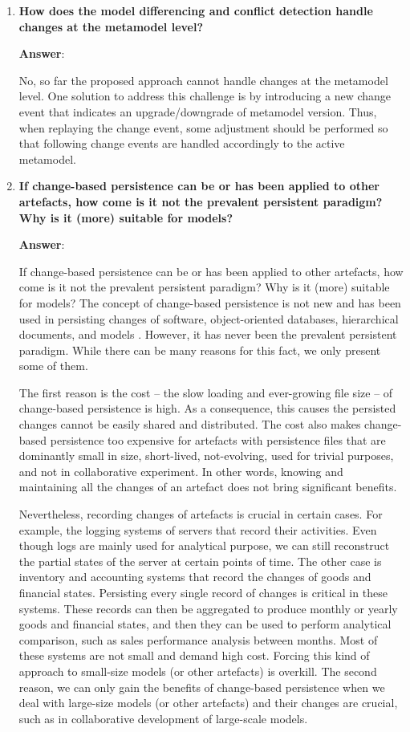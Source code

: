 \begin{enumerate}
  \item \textbf{How does the model differencing and conflict detection handle changes at the metamodel level?}
  
  \textbf{Answer}:
  
  No, so far the proposed approach cannot handle changes at the metamodel level. One solution to address this challenge is by introducing a new change event that indicates an upgrade/downgrade of metamodel version. Thus, when replaying the change event, some adjustment should be performed so that following change events are handled accordingly to the active metamodel.
  
  \item \textbf{If change-based persistence can be or has been applied to other artefacts, how come is it not the prevalent persistent paradigm? Why is it (more) suitable for models?}
  
  \textbf{Answer}:
  
  If change-based persistence can be or has been applied to other artefacts, how come is it not the prevalent persistent paradigm? Why is it (more) suitable for models? The concept of change-based persistence is not new and has been used in persisting changes of software, object-oriented databases, hierarchical documents, and models 
  \cite{DBLP:journals/entcs/RobbesL07,DBLP:conf/sde/LippeO92,DBLP:conf/caise/IgnatN05,koegel2010emfstore}. However, it has never been the prevalent persistent paradigm. While there can be many reasons for this fact, we only present some of them. 
  
  The first reason is the cost -- the slow loading and ever-growing file size -- of change-based persistence is high. As a consequence, this causes the persisted changes cannot be easily shared and distributed. The cost also makes change-based persistence too expensive for artefacts with persistence files that are dominantly small in size, short-lived, not-evolving, used for trivial purposes, and not in collaborative experiment. In other words, knowing and maintaining all the changes of an artefact does not bring significant benefits. 
  
  Nevertheless, recording changes of artefacts is crucial in certain cases. For example, the logging systems of servers that record their activities. Even though logs are mainly used for analytical purpose, we can still reconstruct the partial states of the server at certain points of time. The other case is inventory and accounting systems that record the changes of goods and financial states. Persisting every single record of changes is critical in these systems. These records can then be aggregated to produce monthly or yearly goods and financial states, and then they can be used to perform analytical comparison, such as sales performance analysis between months. Most of these systems are not small and demand high cost. Forcing this kind of approach to small-size models (or other artefacts) is overkill. The second reason, we can only gain the benefits of change-based persistence when we deal with large-size models (or other artefacts) and their changes are crucial, such as in collaborative development of large-scale models.
  

\end{enumerate}
